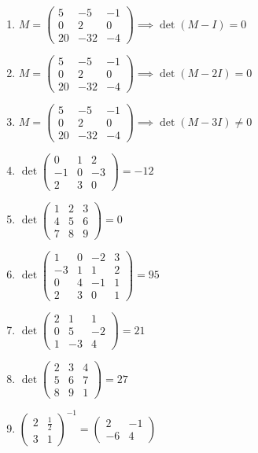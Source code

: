 \documentclass[11pt,a4paper]{article}
\begin{document}
\begin{enumerate}
\item $\displaystyle M = \begin{pmatrix} 5 & -5 & -1 \\ 0 & 2 & 0 \\ 20 & -32 & -4 \end{pmatrix} \implies \det\left( M - I \right) = 0$
\item $\displaystyle M = \begin{pmatrix} 5 & -5 & -1 \\ 0 & 2 & 0 \\ 20 & -32 & -4 \end{pmatrix} \implies \det\left( M - 2I \right) = 0$
\item $\displaystyle M = \begin{pmatrix} 5 & -5 & -1 \\ 0 & 2 & 0 \\ 20 & -32 & -4 \end{pmatrix} \implies \det\left( M - 3I \right) \neq 0$
\item $\displaystyle \det \begin{pmatrix} 0 & 1 & 2 \\ -1 & 0 & -3 \\ 2 & 3 & 0 \end{pmatrix} = -12$
\item $\displaystyle \det \begin{pmatrix} 1 & 2 & 3 \\ 4 & 5 & 6 \\ 7 & 8 & 9 \end{pmatrix} = 0$
\item $\displaystyle \det \begin{pmatrix} 1 & 0 & -2 & 3 \\ -3 & 1 & 1 & 2 \\ 0 & 4 & -1 & 1 \\ 2 & 3 & 0 & 1 \end{pmatrix} = 95$
\item $\displaystyle \det \begin{pmatrix} 2 & 1 & 1 \\ 0 & 5 & -2 \\ 1 & -3 & 4 \end{pmatrix} = 21$
\item $\displaystyle \det \begin{pmatrix} 2 & 3 & 4 \\ 5 & 6 & 7 \\ 8 & 9 & 1 \end{pmatrix} = 27$
\item $\displaystyle \begin{pmatrix} 2 & \frac{1}{2} \\ 3 & 1 \end{pmatrix}^{-1} = \begin{pmatrix} 2 & -1 \\ -6 & 4 \end{pmatrix}$

\end{enumerate}
\end{document}
